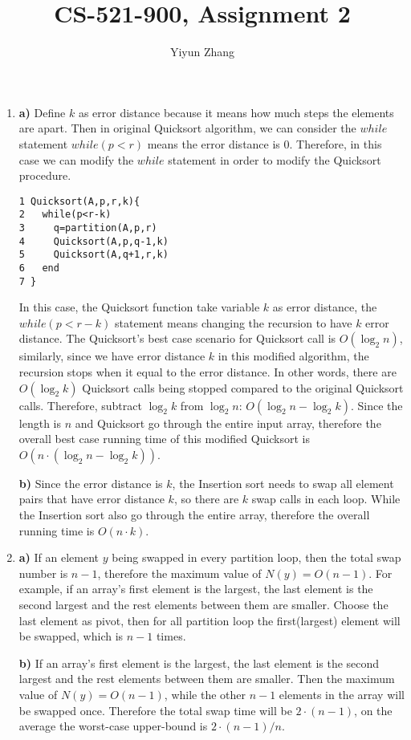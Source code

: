 \documentclass{article}
\title{CS-521-900, Assignment 2}
\author{Yiyun Zhang}
\begin{document}
\maketitle

\begin{enumerate}
\item {\bf a)} Define $k$ as error distance because it means how much steps the elements are apart. Then in original Quicksort algorithm, we can consider the $while$ statement $while(p<r)$ means the error distance is 0. Therefore, in this case we can modify the $while$ statement in order to modify the Quicksort procedure.
\begin{verbatim}
1 Quicksort(A,p,r,k){
2   while(p<r-k)
3     q=partition(A,p,r)
4     Quicksort(A,p,q-1,k)
5     Quicksort(A,q+1,r,k)
6   end
7 } 
\end{verbatim}
In this case, the Quicksort function take variable $k$ as error distance, the $while(p<r-k)$ statement means changing the recursion to have $k$ error distance.
The Quicksort's best case scenario for Quicksort call is $O(\log_2 {n})$, similarly, since we have error distance $k$ in this modified algorithm, the recursion stops when it equal to the error distance. In other words, there are $O(\log_2 {k})$ Quicksort calls being stopped compared to the original Quicksort calls. Therefore, subtract $\log_2 {k}$ from $\log_2 {n}$: $O(\log_2 {n} - \log_2 {k})$.
Since the length is $n$ and Quicksort go through the entire input array, therefore the overall best case running time of this modified Quicksort is $O(n\cdot (\log_2 {n} - \log_2 {k}))$.

{\bf b)} Since the error distance is $k$, the Insertion sort needs to swap all element pairs that have error distance $k$, so there are $k$ swap calls in each loop. While the Insertion sort also go through the entire array, therefore the overall running time is $O(n\cdot k)$.

\item {\bf a)} If an element $y$ being swapped in every partition loop, then the total swap number is $n-1$, therefore the maximum value of $N(y)=O(n-1)$. For example, if an array's first element is the largest, the last element is the second largest and the rest elements between them are smaller. Choose the last element as pivot, then for all partition loop the first(largest) element will be swapped, which is $n-1$ times.

{\bf b)} If an array's first element is the largest, the last element is the second largest and the rest elements between them are smaller. Then the maximum value of $N(y)=O(n-1)$, while the other $n-1$ elements in the array will be swapped once. Therefore the total swap time will be $2\cdot (n-1)$, on the average the worst-case upper-bound is $2\cdot (n-1)/n$.


\end{enumerate}
\end{document}
